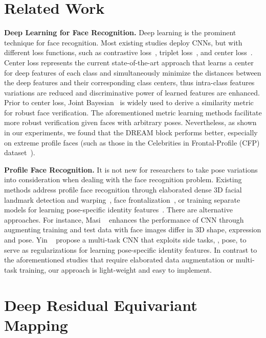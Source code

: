 \documentclass[10pt,twocolumn,letterpaper]{article}
\begin{document}
\section{Related Work}
\label{sec:related_work}


\noindent
\textbf{Deep Learning for Face Recognition.} 
Deep learning is the prominent technique for face recognition. Most existing studies deploy CNNs, but with different loss functions, such as contrastive loss~\cite{sun2014deep}, triplet loss~\cite{schroff2015facenet}, and center loss~\cite{wen2016discriminative}. 
Center loss represents the current state-of-the-art approach that learns a center for deep features of each class and simultaneously minimize the distances between the deep features and their corresponding class centers, thus intra-class features variations are reduced and discriminative power of learned features are enhanced.
Prior to center loss, Joint Bayesian~\cite{chen2012bayesian} is widely used to derive a similarity metric for robust face verification. 
The aforementioned metric learning methods facilitate more robust verification given faces with arbitrary poses. Nevertheless, as shown in our experiments, we found that the DREAM block performs better, especially on extreme profile faces (such as those in the Celebrities in Frontal-Profile (CFP) dataset~\cite{sengupta2016frontal}).


\noindent
\textbf{Profile Face Recognition.} It is not new for researchers to take pose variations into consideration \cite{sengupta2016frontal,masi2016pose,zhong2017towards} when dealing with the face recognition problem. 
Existing methods address profile face recognition through elaborated dense 3D facial landmark detection and warping~\cite{taigman2014deepface}, face frontalization~\cite{tran2017disentangled}, or training separate models for learning pose-specific identity features~\cite{masi2016pose}. 
There are alternative approaches.
For instance, Masi \etal~\cite{masi2016we} enhances the performance of CNN through augmenting training and test data with face images differ in 3D shape, expression and pose.
Yin \etal~\cite{yin2017multi} propose a multi-task CNN that exploits side tasks, \eg, pose, to serve as regularizations for learning pose-specific identity features.
In contrast to the aforementioned studies that require elaborated data augmentation or multi-task training, our approach is light-weight and easy to implement.





\section{Deep Residual Equivariant Mapping}
\label{sec:methodology}
\end{document}
